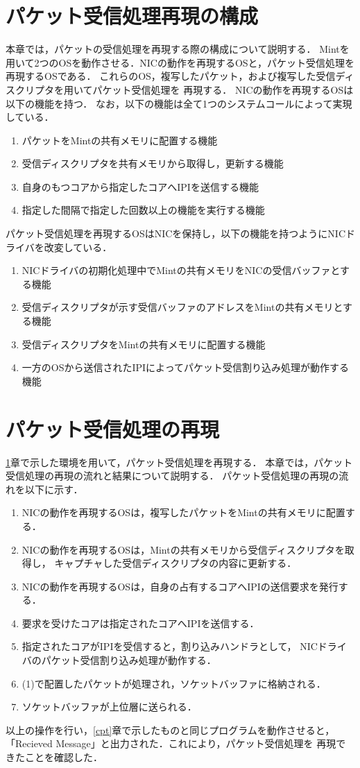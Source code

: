 \documentclass[12pt]{jsarticle}
\begin{document}
\section{パケット受信処理再現の構成}\label{kankyou}
本章では，パケットの受信処理を再現する際の構成について説明する．
Mintを用いて2つのOSを動作させる．NICの動作を再現するOSと，パケット受信処理を再現するOSである．
これらのOS，複写したパケット，および複写した受信ディスクリプタを用いてパケット受信処理を
再現する．
NICの動作を再現するOSは以下の機能を持つ．
なお，以下の機能は全て1つのシステムコールによって実現している．
\begin{enumerate}
    \item パケットをMintの共有メモリに配置する機能
    \item 受信ディスクリプタを共有メモリから取得し，更新する機能
    \item 自身のもつコアから指定したコアへIPIを送信する機能
    \item 指定した間隔で指定した回数以上の機能を実行する機能
\end{enumerate}
パケット受信処理を再現するOSはNICを保持し，以下の機能を持つようにNICドライバを改変している．
\begin{enumerate}
    \item NICドライバの初期化処理中でMintの共有メモリをNICの受信バッファとする機能
    \item 受信ディスクリプタが示す受信バッファのアドレスをMintの共有メモリとする機能
    \item 受信ディスクリプタをMintの共有メモリに配置する機能
    \item 一方のOSから送信されたIPIによってパケット受信割り込み処理が動作する機能
\end{enumerate}

\section{パケット受信処理の再現}
\ref{kankyou}章で示した環境を用いて，パケット受信処理を再現する．
本章では，パケット受信処理の再現の流れと結果について説明する．
パケット受信処理の再現の流れを以下に示す．
\begin{enumerate}
    \item NICの動作を再現するOSは，複写したパケットをMintの共有メモリに配置する．
    \item NICの動作を再現するOSは，Mintの共有メモリから受信ディスクリプタを取得し，
        キャプチャした受信ディスクリプタの内容に更新する．
    \item NICの動作を再現するOSは，自身の占有するコアへIPIの送信要求を発行する．
    \item 要求を受けたコアは指定されたコアへIPIを送信する．
    \item 指定されたコアがIPIを受信すると，割り込みハンドラとして，
        NICドライバのパケット受信割り込み処理が動作する．
    \item (1)で配置したパケットが処理され，ソケットバッファに格納される．
    \item ソケットバッファが上位層に送られる．
\end{enumerate}
以上の操作を行い，\ref{cpt}章で示したものと同じプログラムを動作させると，
「Recieved Message」と出力された．これにより，パケット受信処理を
再現できたことを確認した．
\end{document}
